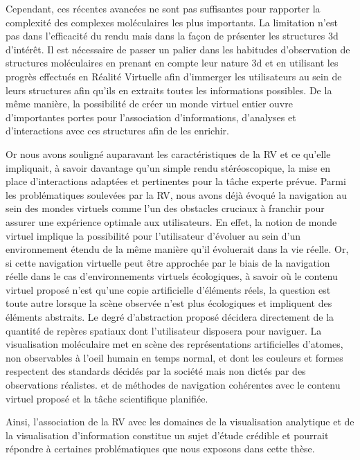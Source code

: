 Cependant, ces récentes avancées ne sont pas suffisantes pour rapporter la complexité des complexes moléculaires les plus importants. La limitation n'est pas dans l'efficacité du rendu mais dans la façon de présenter les structures 3d d'intérêt. Il est nécessaire de passer un palier dans les habitudes d'observation de structures moléculaires en prenant en compte leur nature 3d et en utilisant les progrès effectués en Réalité Virtuelle afin d'immerger les utilisateurs au sein de leurs structures afin qu'ils en extraits toutes les informations possibles. De la même manière, la possibilité de créer un monde virtuel entier ouvre d'importantes portes pour l'association d'informations, d'analyses et d'interactions avec ces structures afin de les enrichir. 

Or nous avons souligné auparavant les caractéristiques de la RV et ce qu'elle impliquait, à savoir davantage qu'un simple rendu stéréoscopique, la mise en place d'interactions adaptées et pertinentes pour la tâche experte prévue.
Parmi les problématiques soulevées par la RV, nous avons déjà évoqué la navigation au sein des mondes virtuels comme l'un des obstacles cruciaux à franchir pour assurer une expérience optimale aux utilisateurs. En effet, la notion de monde virtuel implique la possibilité pour l'utilisateur d'évoluer au sein d'un environnement étendu de la même manière qu'il évoluerait dans la vie réelle. Or, si cette navigation virtuelle peut être approchée par le biais de la navigation réelle dans le cas d'environnements virtuels écologiques, à savoir où le contenu virtuel proposé n'est qu'une copie artificielle d'éléments réels, la question est toute autre lorsque la scène observée n'est plus écologiques et impliquent des éléments abstraits. Le degré d'abstraction proposé décidera directement de la quantité de repères spatiaux dont l'utilisateur disposera pour naviguer. La visualisation moléculaire met en scène des représentations artificielles d'atomes, non observables à l'oeil humain en temps normal, et dont les couleurs et formes respectent des standards décidés par la société mais non dictés par des observations réalistes.
et de méthodes de navigation cohérentes avec le contenu virtuel proposé et la tâche scientifique planifiée.

Ainsi, l'association de la RV avec les domaines de la visualisation analytique et de la visualisation d'information constitue un sujet d'étude crédible et pourrait répondre à certaines problématiques que nous exposons dans cette thèse.



